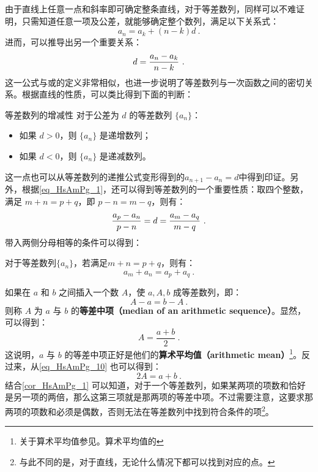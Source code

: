由于直线上任意一点和斜率即可确定整条直线，对于等差数列，同样可以不难证明，只需知道任意一项及公差，就能够确定整个数列，满足以下关系式：
\begin{equation}
a_n=a_k+(n-k)d~.
\end{equation}
进而，可以推导出另一个重要关系：
\begin{equation}\label{eq_HsAmPg_1}
d={a_n-a_k\over n-k}~.
\end{equation}
这一公式与或的定义非常相似，也进一步说明了等差数列与一次函数之间的密切关系。根据直线的性质，可以类比得到下面的判断：

\begin{corollary}{等差数列的增减性}\label{cor_HsAmPg_2}
对于公差为 $d$ 的等差数列 $\{a_n\}$：
\begin{itemize}
\item 如果 $d > 0$，则 $\{a_n\}$ 是递增数列；
\item 如果 $d < 0$，则 $\{a_n\}$ 是递减数列。
\end{itemize}
\end{corollary}

这一点也可以从等差数列的递推公式变形得到的$a_{n+1}-a_n=d$中得到印证。另外，根据\autoref{eq_HsAmPg_1}，还可以得到等差数列的一个重要性质：取四个整数，满足 $m+n=p+q$，即 $p-n=m-q$，则有：
\begin{equation}
{a_p-a_n\over p-n}=d={a_m-a_q\over m-q}~.
\end{equation}
带入两侧分母相等的条件可以得到：
\begin{corollary}{}\label{cor_HsAmPg_1}
对于等差数列$\{a_n\}$，若满足$m+n=p+q$，则有：
\begin{equation}
a_m+a_n=a_p+a_q~.
\end{equation}
\end{corollary}

如果在 $a$ 和 $b$ 之间插入一个数 $A$，使 $a, A, b$ 成等差数列，即：
\begin{equation}\label{eq_HsAmPg_10}
A - a = b - A~.
\end{equation}
则称 $A$ 为 $a$ 与 $b$ 的\textbf{等差中项（median of an arithmetic sequence）}。显然，可以得到：
\begin{equation}
A = \frac{a+b}{2}~.
\end{equation}
这说明，$a$ 与 $b$ 的等差中项正好是他们的\textbf{算术平均值（arithmetic mean）}\footnote{关于算术平均值参见。算术平均值的}。反过来，从\autoref{eq_HsAmPg_10} 也可以得到：
\begin{equation}
2A = a+b~.
\end{equation}
结合\autoref{cor_HsAmPg_1} 可以知道，对于一个等差数列，如果某两项的项数和恰好是另一项的两倍，那么这第三项就是那两项的等差中项。不过需要注意，这要求那两项的项数和必须是偶数，否则无法在等差数列中找到符合条件的项\footnote{与此不同的是，对于直线，无论什么情况下都可以找到对应的点。}。

